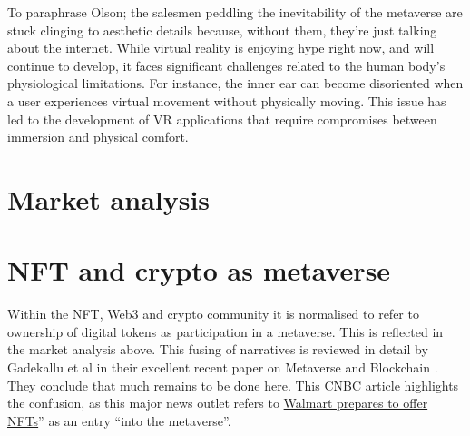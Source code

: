 To paraphrase Olson; the salesmen peddling the inevitability of the metaverse are stuck clinging to aesthetic details because, without them, they're just talking about the internet. While virtual reality is enjoying hype right now, and will continue to develop, it faces significant challenges related to the human body's physiological limitations. For instance, the inner ear can become disoriented when a user experiences virtual movement without physically moving. This issue has led to the development of VR applications that require compromises between immersion and physical comfort.
\section{Market analysis}

\section{NFT and crypto as metaverse}
Within the NFT, Web3 and crypto community it is normalised to refer to ownership of digital tokens as participation in a metaverse. This is reflected in the market analysis above. This fusing of narratives is reviewed in detail by Gadekallu et al in their excellent recent paper on Metaverse and Blockchain \cite{gadekallu2022blockchain}. They conclude that much remains to be done here. This CNBC article highlights the confusion, as this major news outlet refers to \href{https://www.cnbc.com/2022/01/16/walmart-is-quietly-preparing-to-enter-the-metaverse.html}{Walmart prepares to offer NFTs}'' as an entry ``into the metaverse''.
